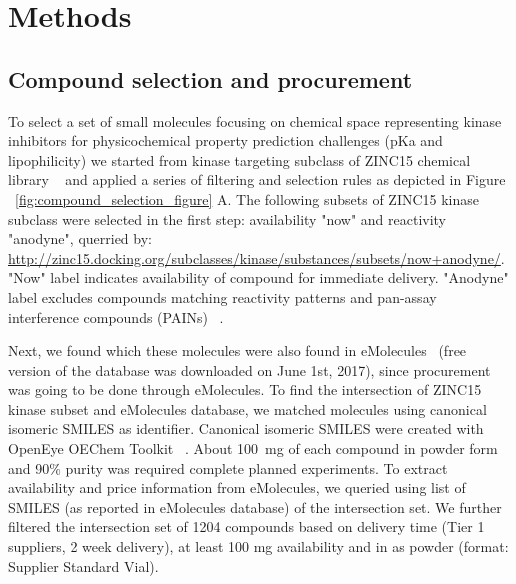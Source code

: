 \documentclass[9pt,lineno]{elife}
\begin{document}
\section{Methods}

\subsection{Compound selection and procurement}
To select a set of small molecules focusing on chemical space representing kinase inhibitors for physicochemical property prediction challenges (pKa and lipophilicity) we started from kinase targeting subclass of ZINC15 chemical library ~\citep{sterling_zinc_2015} and applied a series of filtering and selection rules as depicted in Figure ~\ref{fig:compound_selection_figure} A. The following subsets of ZINC15 kinase subclass were selected in the first step: availability "now" and reactivity "anodyne", querried by:
\url{http://zinc15.docking.org/subclasses/kinase/substances/subsets/now+anodyne/}. "Now" label indicates availability of compound for immediate delivery. "Anodyne" label excludes compounds matching reactivity patterns and pan-assay interference compounds (PAINs) ~\citep{baell_new_2010, saubern_knime_2011}. 

Next, we found which these molecules were also found in eMolecules~\citep{eMolecules_ref_2017} (free version of the database was downloaded on June 1st, 2017), since procurement was going to be done through eMolecules. To find the intersection of ZINC15 kinase subset and eMolecules database, we matched molecules using canonical isomeric SMILES as identifier. Canonical isomeric SMILES were created with OpenEye OEChem Toolkit ~\citep{oechem_openeye_2017}. About 100~mg of each compound in powder form and 90\% purity was required complete planned experiments. To extract availability and price information from eMolecules, we queried using list of SMILES (as reported in eMolecules database) of the intersection set. We further filtered the intersection set of 1204 compounds based on delivery time (Tier 1 suppliers, 2 week delivery), at least 100 mg availability and in as powder (format: Supplier Standard Vial). 
\end{document}
